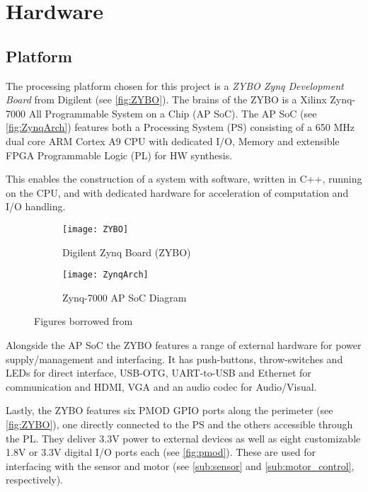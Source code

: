 \documentclass[Main]{subfiles}
\begin{document}
\section{Hardware} %
\label{sec:hardware}

	\subsection{Platform} %
	\label{sub:platform}

		The processing platform chosen for this project is a \emph{ZYBO Zynq Development Board} from Digilent (see \autoref{fig:ZYBO}).
		The brains of the ZYBO is a Xilinx Zynq-7000 All Programmable System on a Chip (AP SoC).
		The AP SoC (see \autoref{fig:ZynqArch}) features both a Processing System (PS) consisting of a 650 MHz dual core ARM\textregistered{} Cortex A9 CPU with dedicated I/O, Memory and extensible FPGA Programmable Logic (PL) for HW synthesis.

		This enables the construction of a system with software, written in C++, running on the CPU, and with dedicated hardware for acceleration of computation and I/O handling.
		\begin{figure}[H]
			\centering
			\begin{subfigure}[b]{0.55\linewidth}
				\texttt{[image: ZYBO]}
				\caption{Digilent Zynq Board (ZYBO)}
				\label{fig:ZYBO}
			\end{subfigure}		
			\begin{subfigure}[b]{0.4\linewidth}
				\texttt{[image: ZynqArch]}
				\caption{Zynq-7000 AP SoC Diagram}
				\label{fig:ZynqArch}
			\end{subfigure}
			\caption{Figures borrowed from \cite{Digilent2014}}		
		\end{figure}

		Alongside the AP SoC the ZYBO features a range of external hardware for power supply/management and interfacing.
		It has push-buttons, throw-switches and LEDs for direct interface, USB-OTG, UART-to-USB and Ethernet for communication and HDMI, VGA and an audio codec for Audio/Visual.

		Lastly, the ZYBO features six PMOD GPIO ports along the perimeter (see \autoref{fig:ZYBO}), one directly connected to the PS and the others accessible through the PL.
		They deliver 3.3V power to external devices as well as eight customizable 1.8V or 3.3V digital I/O ports each (see \autoref{fig:pmod}).
		These are used for interfacing with the sensor and motor (see \autoref{sub:sensor} and \autoref{sub:motor_control}, respectively).
\end{document}
